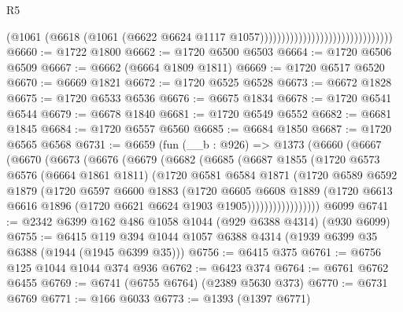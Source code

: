 \begin{lexlean}{R5}
\begin{coremodule}
                                                          (@1061
                                                            (@6618
                                                              (@1061
                                                                (@6622
                                                                  @6624
                                                                  @1117
                                                                  @1057)))))))))))))))))))))))))))))))
@6660 := @1722 @1800
@6662 := @1720 @6500 @6503
@6664 := @1720 @6506 @6509
@6667 := @6662 (@6664 @1809 @1811)
@6669 := @1720 @6517 @6520
@6670 := @6669 @1821
@6672 := @1720 @6525 @6528
@6673 := @6672 @1828
@6675 := @1720 @6533 @6536
@6676 := @6675 @1834
@6678 := @1720 @6541 @6544
@6679 := @6678 @1840
@6681 := @1720 @6549 @6552
@6682 := @6681 @1845
@6684 := @1720 @6557 @6560
@6685 := @6684 @1850
@6687 := @1720 @6565 @6568
@6731 := @6659
    (fun (__b : @926) =>
    @1373
      (@6660
        (@6667
          (@6670
            (@6673
              (@6676
                (@6679
                  (@6682
                    (@6685
                      (@6687
                        @1855
                        (@1720
                          @6573
                          @6576
                          (@6664 @1861 @1811)
                          (@1720
                            @6581
                            @6584
                            @1871
                            (@1720
                              @6589
                              @6592
                              @1879
                              (@1720
                                @6597
                                @6600
                                @1883
                                (@1720
                                  @6605
                                  @6608
                                  @1889
                                  (@1720
                                    @6613
                                    @6616
                                    @1896
                                    (@1720 @6621 @6624 @1903 @1905)))))))))))))))))
    @6099
@6741 := @2342 @6399 @162 @486 @1058 @1044 (@929 @6388 @4314) (@930 @6099)
@6755 := @6415 @119 @394 @1044 @1057 @6388 @4314 (@1939 @6399 @35 @6388 (@1944 (@1945 @6399 @35)))
@6756 := @6415 @375
@6761 := @6756 @125 @1044 @1044 @374 @936
@6762 := @6423 @374
@6764 := @6761 @6762 @6455
@6769 := @6741 (@6755 @6764) (@2389 @5630 @373)
@6770 := @6731 @6769
@6771 := @166 @6033
@6773 := @1393 (@1397 @6771)

\end{coremodule}
\end{lexlean}
